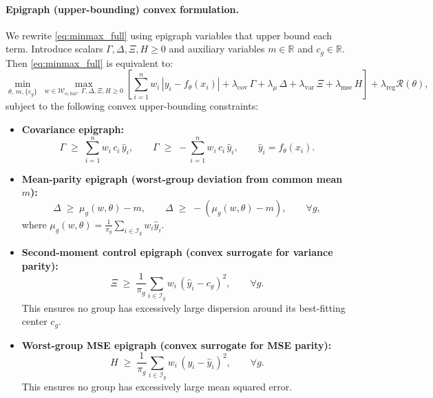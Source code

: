 \documentclass{article}
\begin{document}
\paragraph{Epigraph (upper-bounding) convex formulation.}
We rewrite \eqref{eq:minmax_full} using epigraph variables that upper bound each term.
Introduce scalars $\Gamma,\Delta,\Xi,H\ge 0$ and auxiliary variables $m\in\mathbb{R}$ and $c_g\in\mathbb{R}$.
Then \eqref{eq:minmax_full} is equivalent to:
\begin{equation}
\min_{\theta,\ m,\{c_g\}}
\ \max_{w\in\mathcal{W}_{\alpha,\mathrm{bal}},\ \Gamma,\Delta,\Xi,H\ge 0}
\left[
\sum_{i=1}^n w_i\,|y_i-f_\theta(x_i)|
+\lambda_{\mathrm{cov}}\,\Gamma
+\lambda_{\mu}\,\Delta
+\lambda_{\mathrm{var}}\,\Xi
+\lambda_{\mathrm{mse}}\,H
\right]
+\lambda_{\mathrm{reg}}\mathcal{R}(\theta),
\label{eq:minmax_epi}
\end{equation}
subject to the following convex upper-bounding constraints:
\begin{itemize}
\item \textbf{Covariance epigraph:}
\begin{equation}
\Gamma \;\ge\; \sum_{i=1}^n w_i\,c_i\,\hat y_i,
\qquad
\Gamma \;\ge\; -\sum_{i=1}^n w_i\,c_i\,\hat y_i,
\qquad \hat y_i=f_\theta(x_i).
\label{eq:cov_epi}
\end{equation}

\item \textbf{Mean-parity epigraph (worst-group deviation from common mean $m$):}
\begin{equation}
\Delta \;\ge\; \mu_g(w,\theta)-m,
\qquad
\Delta \;\ge\; -(\mu_g(w,\theta)-m),
\qquad \forall g,
\label{eq:mean_epi}
\end{equation}
where $\mu_g(w,\theta)=\frac{1}{\pi_g}\sum_{i\in\mathcal{I}_g} w_i \hat y_i$.

\item \textbf{Second-moment control epigraph (convex surrogate for variance parity):}
\begin{equation}
\Xi \;\ge\; \frac{1}{\pi_g}\sum_{i\in\mathcal{I}_g} w_i\,(\hat y_i - c_g)^2,
\qquad \forall g.
\label{eq:var_epi}
\end{equation}
This ensures no group has excessively large dispersion around its best-fitting center $c_g$.

\item \textbf{Worst-group MSE epigraph (convex surrogate for MSE parity):}
\begin{equation}
H \;\ge\; \frac{1}{\pi_g}\sum_{i\in\mathcal{I}_g} w_i\,(y_i-\hat y_i)^2,
\qquad \forall g.
\label{eq:mse_epi}
\end{equation}
This ensures no group has excessively large mean squared error.
\end{itemize}
\end{document}
